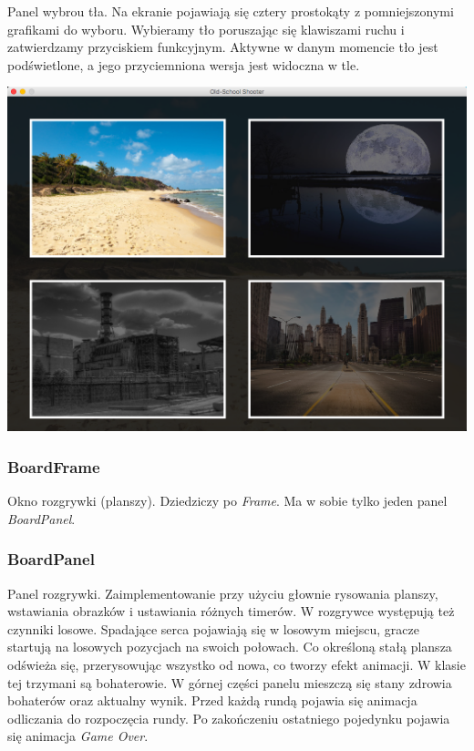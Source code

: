 \documentclass[a4paper,10pt]{article}
\begin{document}
Panel wybrou tła. Na ekranie pojawiają się cztery prostokąty z pomniejszonymi grafikami do wyboru. Wybieramy tło poruszając się klawiszami ruchu i zatwierdzamy przyciskiem funkcyjnym. Aktywne w danym momencie tło jest podświetlone, a jego przyciemniona wersja jest widoczna w tle.

\begin{center}
\includegraphics[scale=0.18]{tlo.png}
\end{center}

\subsubsection{BoardFrame}

Okno rozgrywki (planszy). Dziedziczy po \textit{Frame}. Ma w sobie tylko jeden panel \textit{BoardPanel}.

\subsubsection{BoardPanel}

Panel rozgrywki. Zaimplementowanie przy użyciu głownie rysowania planszy, wstawiania obrazków i ustawiania różnych timerów. W rozgrywce występują też czynniki losowe. Spadające serca pojawiają się w losowym miejscu, gracze startują na losowych pozycjach na swoich połowach. Co określoną stałą plansza odświeża się, przerysowując wszystko od nowa, co tworzy efekt animacji. W klasie tej trzymani są bohaterowie. W górnej części panelu mieszczą się stany zdrowia bohaterów oraz aktualny wynik. Przed każdą rundą pojawia się animacja odliczania do rozpoczęcia rundy. Po zakończeniu ostatniego pojedynku pojawia się animacja \textit{Game Over}.
\end{document}
